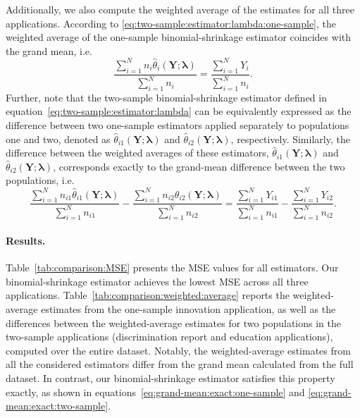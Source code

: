 \documentclass[12pt,letterpaper]{article}
\begin{document}
Additionally, we also compute the weighted average of the estimates for all three applications. According to \eqref{eq:two-sample:estimator:lambda:one-sample}, the weighted average of the one-sample binomial-shrinkage estimator coincides with the grand mean, i.e. 
\begin{equation}\label{eq:grand-mean:exact:one-sample}
    \frac{\sum_{i=1}^Nn_i\hat{\theta}_i(\mathbf{Y}; \boldsymbol{\lambda})}{\sum_{i=1}^Nn_i}=\frac{\sum_{i=1}^NY_i}{\sum_{i=1}^Nn_i}.
\end{equation}
Further, note that the two-sample binomial-shrinkage estimator defined in equation~\eqref{eq:two-sample:estimator:lambda} can be equivalently expressed as the difference between two one-sample estimators applied separately to populations one and two, denoted as $\hat{\theta}_{i1}(\mathbf{Y};\boldsymbol{\lambda})$ and $\hat{\theta}_{i2}(\mathbf{Y};\boldsymbol{\lambda})$, respectively. Similarly, the difference between the weighted averages of these estimators, $\hat{\theta}_{i1}(\mathbf{Y};\boldsymbol{\lambda})$ and $\hat{\theta}_{i2}(\mathbf{Y};\boldsymbol{\lambda})$, corresponds exactly to the grand-mean difference between the two populations, i.e. 
\begin{equation}\label{eq:grand-mean:exact:two-sample}
    \frac{\sum_{i=1}^Nn_{i1}\hat{\theta}_{i1}(\mathbf{Y}; \boldsymbol{\lambda})}{\sum_{i=1}^Nn_{i1}}-\frac{\sum_{i=1}^Nn_{i2}\hat{\theta}_{i2}(\mathbf{Y}; \boldsymbol{\lambda})}{\sum_{i=1}^Nn_{i2}}=\frac{\sum_{i=1}^NY_{i1}}{\sum_{i=1}^Nn_{i1}}-\frac{\sum_{i=1}^NY_{i2}}{\sum_{i=1}^Nn_{i2}}. 
\end{equation}

\paragraph{Results. } Table~\ref{tab:comparison:MSE} presents the MSE values for all estimators. Our binomial-shrinkage estimator achieves the lowest MSE across all three applications. 
Table~\ref{tab:comparison:weighted:average} reports the weighted-average estimates from the one-sample innovation application, as well as the differences between the weighted-average estimates for two populations in the two-sample applications (discrimination report and education applications), computed over the entire dataset. Notably, the weighted-average estimates from all the considered estimators differ from the grand mean calculated from the full dataset. In contrast, our binomial-shrinkage estimator satisfies this property exactly, as shown in equations~\eqref{eq:grand-mean:exact:one-sample} and \eqref{eq:grand-mean:exact:two-sample}.
\end{document}
